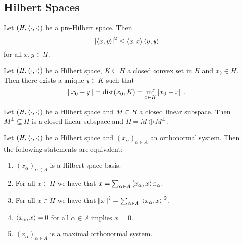 \subsection{Hilbert Spaces}

\begin{lemma}
	Let $(H,\inprod{\cdot}{\cdot})$ be a pre-Hilbert space. Then
	\begin{equation}
		\abs[0]{\inprod{x}{y}}^2 \leq \inprod{x}{x}\inprod{y}{y}	
	\end{equation}
	\noindent for all $x,y \in H$.
\end{lemma}

\begin{theorem}
	Let $(H,\inprod{\cdot}{\cdot})$ be a Hilbert space, $K \subseteq H$ a closed convex set in $H$ and $x_0 \in H$. Then there exists a unique $y \in K$ such that 
	\begin{equation}
		\norm{x_0 - y} = \dist(x_0,K) = \inf_{x \in K}\norm{x_0 - x}.
	\end{equation}
\end{theorem}

\begin{theorem}
	Let $(H,\inprod{\cdot}{\cdot})$ be a Hilbert space and $M \subseteq H$ a closed linear subspace. Then $M^\perp \subseteq H$ is a closed linear subspace and $H = M \oplus M^\perp$.
\end{theorem}

\begin{theorem}
	Let $(H,\inprod{\cdot}{\cdot})$ be a Hilbert space and $(x_\alpha)_{\alpha \in A}$ an orthonormal system. Then the following statements are equivalent:
	\begin{enumerate}[label = \textup{(}\roman*\textup{)},wide = 0pt, itemsep = 1.5ex]
		\item $(x_\alpha)_{\alpha \in A}$ is a Hilbert space basis.
		\item For all $x \in H$ we have that $x = \sum_{\alpha \in A}\inprod{x_\alpha}{x}x_\alpha$.
		\item For all $x \in H$ we have that $\norm{x}^2 = \sum_{\alpha \in A} \abs[0]{\inprod{x_\alpha}{x}}^2$.
		\item $\inprod{x_\alpha}{x} = 0$ for all $\alpha \in A$ implies $x = 0$.
		\item $(x_\alpha)_{\alpha \in A}$ is a maximal orthonormal system.
	\end{enumerate}
\end{theorem}
